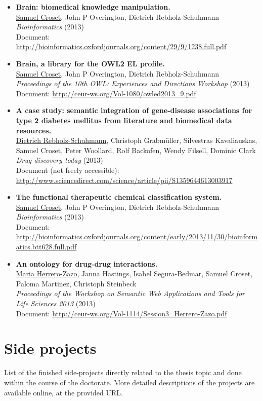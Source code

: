 \begin{itemize}
  \item \textbf{Brain: biomedical knowledge manipulation.} \\ \underline{Samuel Croset}, John P Overington, Dietrich Rebholz-Schuhmann \\ \emph{Bioinformatics} (2013) \\ Document: \url{http://bioinformatics.oxfordjournals.org/content/29/9/1238.full.pdf}
  \item \textbf{Brain, a library for the OWL2 EL profile.} \\ \underline{Samuel Croset}, John P Overington, Dietrich Rebholz-Schuhmann \\ \emph{Proceedings of the 10th OWL: Experiences and Directions Workshop} (2013) \\ Document: \url{http://ceur-ws.org/Vol-1080/owled2013_9.pdf}
  \item \textbf{A case study: semantic integration of gene-disease associations for type 2 diabetes mellitus from literature and biomedical data resources.} \\ \underline{Dietrich Rebholz-Schuhmann}, Christoph Grabmüller, Silvestras Kavaliauskas, Samuel Croset, Peter Woollard, Rolf Backofen, Wendy Filsell, Dominic Clark \\ \emph{Drug discovery today} (2013) \\ Document (not freely accessible): \url{http://www.sciencedirect.com/science/article/pii/S1359644613003917}
  \item \textbf{The functional therapeutic chemical classification system.} \\ \underline{Samuel Croset}, John P Overington, Dietrich Rebholz-Schuhmann \\ \emph{Bioinformatics} (2013) \\ Document: \url{http://bioinformatics.oxfordjournals.org/content/early/2013/11/30/bioinformatics.btt628.full.pdf}
  \item \textbf{An ontology for drug-drug interactions.} \\ \underline{Maria Herrero-Zazo}, Janna Hastings, Isabel Segura-Bedmar, Samuel Croset, Paloma Martinez, Christoph Steinbeck \\ \emph{Proceedings of the Workshop on Semantic Web Applications and Tools for Life Sciences 2013} (2013) \\ Document: \url{http://ceur-ws.org/Vol-1114/Session3_Herrero-Zazo.pdf}
\end{itemize}

\chapter{Side projects}
List of the finished side-projects directly related to the thesis topic and done within the course of the doctorate. More detailed descriptions of the projects are available online, at the provided URL.

